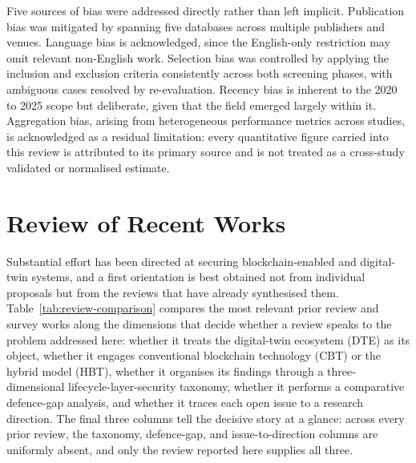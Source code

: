 Five sources of bias were addressed directly rather than left implicit.
Publication bias was mitigated by spanning five databases across multiple
publishers and venues. Language bias is acknowledged, since the English-only
restriction may omit relevant non-English work. Selection bias was
controlled by applying the inclusion and exclusion criteria consistently across
both screening phases, with ambiguous cases resolved by re-evaluation. Recency
bias is inherent to the 2020 to 2025 scope but deliberate, given that the field
emerged largely within it. Aggregation bias, arising from heterogeneous
performance metrics across studies, is acknowledged as a residual limitation:
every quantitative figure carried into this review is attributed to its primary
source and is not treated as a cross-study validated or normalised estimate.

\section{Review of Recent Works}
\label{sec:recent-works}

Substantial effort has been directed at securing blockchain-enabled and
digital-twin systems, and a first orientation is best obtained not from
individual proposals but from the reviews that have already synthesised them.
Table~\ref{tab:review-comparison} compares the most relevant prior review and
survey works along the dimensions that decide whether a review speaks to the
problem addressed here: whether it treats the digital-twin ecosystem (DTE) as its
object, whether it engages conventional blockchain technology (CBT) or the hybrid
model (HBT), whether it organises its findings through a three-dimensional
lifecycle-layer-security taxonomy, whether it performs a comparative defence-gap
analysis, and whether it traces each open issue to a research direction. The
final three columns tell the decisive story at a glance: across every prior
review, the taxonomy, defence-gap, and issue-to-direction columns are uniformly
absent, and only the review reported here supplies all three.

